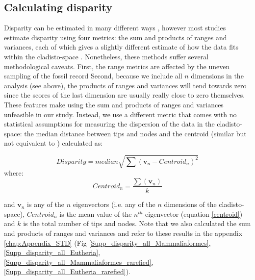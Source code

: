 \subsection{Calculating disparity}
Disparity can be estimated in many different ways \citep[e.g.][]{Wills1994,Ciampaglio2004,thorneresetting2011,hopkinsdecoupling2013,huang2015origins}, however most studies estimate disparity using four metrics: the sum and products of ranges and variances, each of which gives a slightly different estimate of how the data fits within the cladisto-space \citep{Foote01071994,Wills1994,brusatte50,Brusatte12092008,cisneros2010,thorneresetting2011,prentice2011,brusattedinosaur2012,toljagictriassic-jurassic2013,ruta2013,bentonmodels2014,bensonfaunal2014}.
Nonetheless, these methods suffer several methodological caveats.
First, the range metrics are affected by the uneven sampling of the fossil record \citep{Butler2012}
Second, because we include all $n$ dimensions in the analysis (see above), the products of ranges and variances will tend towards zero since the scores of the last dimension are usually really close to zero themselves. 
These features make using the sum and products of ranges and variances unfeasible in our study.
Instead, we use a different metric that comes with no statistical assumptions for measuring the dispersion of the data in the cladisto-space: the median distance between tips and nodes and the centroid (similar but not equivalent to \citealt{Wills1994,kornextinction2013,huang2015origins}) calculated as:

\begin{equation}
   Disparity=median{\displaystyle\sqrt{\sum{(\mathbf{v}_{n}-Centroid_{n})^2}}}
    \label{disparity}
\end{equation}
where:
\begin{equation}
    Centroid_{n}=\frac{\displaystyle\sum(\mathbf{v}_{n})}{k} 
    \label{centroid}
\end{equation}

\noindent
and $\mathbf{v}_{n}$ is any of the $n$ eigenvectors (i.e. any of the $n$ dimensions of the cladisto-space), $Centroid_{n}$ is the mean value of the $n^{th}$ eigenvector (equation \ref{centroid}) and $k$ is the total number of tips and nodes.
Note that we also calculated the sum and products of ranges and variances and refer to these results in the appendix \ref{chap:Appendix_STD} (Fig \ref{Supp_disparity_all_Mammaliaformes}, \ref{Supp_disparity_all_Eutheria}, \ref{Supp_disparity_all_Mammaliaformes_rarefied}, \ref{Supp_disparity_all_Eutheria_rarefied}). %


